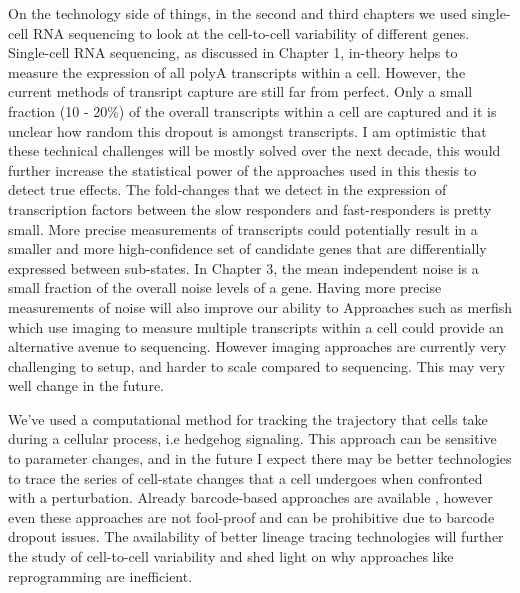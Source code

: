 On the technology side of things, in the second and third chapters we  used single-cell RNA sequencing to look at the cell-to-cell variability of different genes. Single-cell RNA sequencing, as discussed in Chapter 1, in-theory helps to measure the expression of all polyA transcripts within a cell. However, the current methods of transript capture are still far from perfect. Only a small fraction (10 - 20\%) of the overall transcripts within a cell are captured \cite{pachter's postdoc} and it is unclear how random this dropout is amongst transcripts. I am optimistic that these technical challenges will be mostly solved over the next decade, this would further increase the statistical power of the approaches used in this thesis to detect true effects. The fold-changes that we detect in the expression of transcription factors between the slow responders and fast-responders is pretty small. More precise measurements of transcripts could potentially result in a smaller and more high-confidence set of candidate genes that are differentially expressed between sub-states. In Chapter 3, the mean independent noise is a small fraction of the overall noise levels of a gene. Having more precise measurements of noise will also improve our ability to Approaches such as merfish \cite{merfish} which use imaging to measure multiple transcripts within a cell could provide an alternative avenue to sequencing. However imaging approaches are currently very challenging to setup, and harder to scale compared to sequencing. This may very well change in the future.

We've used a computational method for tracking the trajectory that cells take during a cellular process, i.e hedgehog signaling. This approach can be sensitive to parameter changes, and in the future I expect there may be better technologies to trace the series of cell-state changes that a cell undergoes when confronted with a perturbation. Already barcode-based approaches are available \cite{morris lineaage tracing, arnav's paper}, however even these approaches are not fool-proof and can be prohibitive due to barcode dropout issues. The availability of better lineage tracing technologies will further the study of cell-to-cell variability and shed light on why approaches like reprogramming are inefficient.


